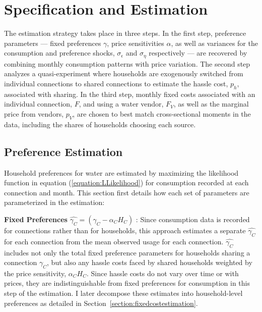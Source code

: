 \documentclass[12pt]{article}
\begin{document}
\section{Specification and Estimation}\label{section:specificationandestimation}

The estimation strategy takes place in three steps.  In the first step, preference parameters --- fixed preferences $\gamma$, price sensitivities $\alpha$, as well as variances for the consumption and preference shocks, $\sigma_{\epsilon}$ and $\sigma_{\eta}$ respectively --- are recovered by combining monthly consumption patterns with price variation.  The second step analyzes a quasi-experiment where households are exogenously switched from individual connections to shared connections to estimate the hassle cost, $p_h$, associated with sharing.  In the third step, monthly fixed costs associated with an individual connection, $F$, and using a water vendor, $F_{V}$, as well as the marginal price from vendors, $p_V$, are chosen to best match cross-sectional moments in the data, including the shares of households choosing each source.

\subsection{Preference Estimation}\label{section:preferenceestimation}

Household preferences for water are estimated by maximizing the likelihood function in equation (\ref{equation:LLikelihood}) for consumption recorded at each connection and month.  This section first details how each set of parameters are parameterized in the estimation:

\textbf{Fixed Preferences} $\hat{\gamma_C} = (\gamma_C - \alpha_C H_C)$  :  Since consumption data is recorded for connections rather than for households, this approach estimates a separate $\hat{\gamma_C}$ for each connection from the mean observed usage for each connection.  $\hat{\gamma_C}$ includes not only the total fixed preference parameters for households sharing a connection $\gamma_C$, but also any hassle costs faced by shared households weighted by the price sensitivity, $\alpha_C H_C$.  Since hassle costs do not vary over time or with prices, they are indistinguishable from fixed preferences for consumption in this step of the estimation.  I later decompose these estimates into household-level preferences as detailed in Section~\ref{section:fixedcostestimation}.
\end{document}
